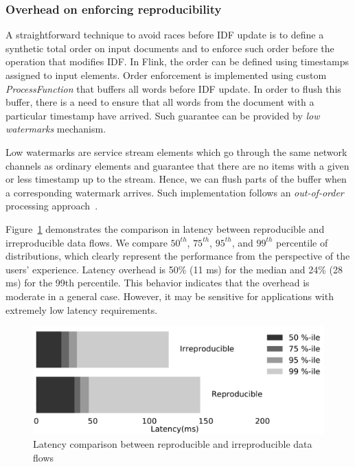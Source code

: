 \subsubsection{Overhead on enforcing reproducibility}

A straightforward technique to avoid races before IDF update is to define a synthetic total order on input documents and to enforce such order before the operation that modifies IDF. In Flink, the order can be defined using timestamps assigned to input elements. Order enforcement is implemented using custom {\it ProcessFunction} that buffers all words before IDF update. In order to flush this buffer, there is a need to ensure that all words from the document with a particular timestamp have arrived. Such guarantee can be provided by {\em low watermarks} mechanism. 

Low watermarks are service stream elements which go through the same network channels as ordinary elements and guarantee that there are no items with a given or less timestamp up to the stream. Hence, we can flush parts of the buffer when a corresponding watermark arrives. Such implementation follows an {\em out-of-order} processing approach~\cite{Li:2008:OPN:1453856.1453890}.

Figure~\ref{reproducibility} demonstrates the comparison in latency between reproducible and irreproducible data flows. We compare $50^{th}$, $75^{th}$, $95^{th}$, and $99^{th}$ percentile of distributions, which clearly represent the performance from the perspective of the users' experience. Latency overhead is 50\% (11 ms) for the median and 24\% (28 ms) for the 99th percentile. This behavior indicates that the overhead is moderate in a general case. However, it may be sensitive for applications with extremely low latency requirements.

\begin{figure}[htbp]
  \centering
  \includegraphics[scale=0.09]{pics/reproducibility}
  \caption{Latency comparison between reproducible and irreproducible data flows}
  \label {reproducibility}
\end{figure}

